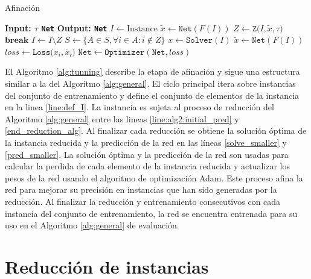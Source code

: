 \documentclass[spanish, a4paper, 12pt, openany,final]{book}
\begin{document}
\begin{algorithm}[H]
	\caption{Afinación}\label{alg:tunning}
	\begin{algorithmic}[1]
		\Statex \textbf{Input: $\tau$ \texttt{Net}}
		\Statex \textbf{Output: \texttt{Net}}
				\State $I \gets \text{Instance}$ \label{line:def_I}
				\Loop
					\State $\tilde{x} \gets \texttt{Net}(F(I))$   \label{line:alg2:initial_pred}
					\State $Z \gets \texttt{Z($I,\tilde{x},\tau$)}$ \label{start_reduction_alg}
						\State $\textbf{break}$ 
					\EndIf
					\State $I \gets I\setminus Z$ \label{alg1:update_I_2}
					\State $S \gets \{A \in S, \forall i \in A: i \notin Z\}$  \label{end_reduction_alg}
				\State $x \gets \texttt{Solver}(I)$   \label{solve_smaller}
				\State $\tilde{x} \gets \texttt{Net}(F(I))$  \label{pred_smaller}
				\State $loss \gets \texttt{Loss($x_i,\tilde{x_i})$}$ \label{smaller_loss}
				\State $\texttt{Net} \gets \texttt{Optimizer}(\texttt{Net},loss)$	  \label{smaller_optim}
			\EndFor
			\EndLoop
		\EndFor
	\end{algorithmic}
\end{algorithm}

El Algoritmo \ref{alg:tunning} describe la etapa de afinación y sigue una estructura similar a la del Algoritmo \ref{alg:general}. El ciclo principal itera sobre instancias del conjunto de entrenamiento y define el conjunto de elementos de la instancia en la linea \ref{line:def_I}. La instancia es sujeta al proceso de reducción del Algoritmo \ref{alg:general} entre las lineas \ref{line:alg2:initial_pred} y \ref{end_reduction_alg}. Al finalizar cada reducción se obtiene la solución óptima de la instancia reducida y la predicción de la red en las líneas \ref{solve_smaller} y \ref{pred_smaller}. La solución óptima y la predicción de la red son usadas para calcular la perdida de cada elemento de la instancia reducida y actualizar los pesos de la red usando el algoritmo de optimización Adam. Este proceso afina la red para mejorar su precisión en instancias que han sido generadas por la reducción. Al finalizar la reducción y entrenamiento consecutivos con cada instancia del conjunto de entrenamiento, la red se encuentra entrenada para su uso en el Algoritmo \ref{alg:general} de evaluación.


 \section{Reducción de instancias}
 
\end{document}
